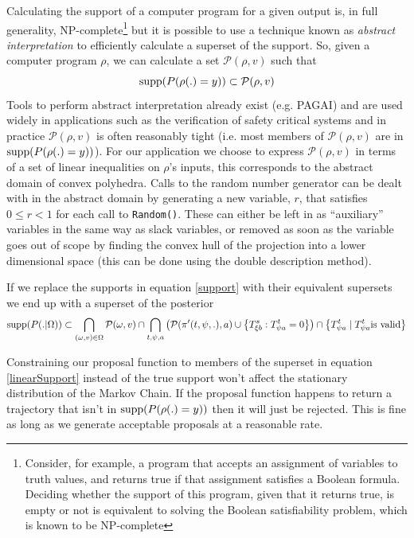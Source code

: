 Calculating the support of a computer program for a given output is, in full generality, NP-complete\footnote{Consider, for example, a program that accepts an assignment of variables to truth values, and returns true if that assignment satisfies a Boolean formula. Deciding whether the support of this program, given that it returns true, is empty or not is equivalent to solving the Boolean satisfiability problem, which is known to be NP-complete\cite{cook1971complexity}} but it is possible to use a technique known as \textit{abstract interpretation}\cite{cousot1977abstract} to efficiently calculate a superset of the support. So, given a computer program $\rho$, we can calculate a set $\mathcal{P}(\rho, v)$ such that
\[
\operatorname{supp}(P(\rho(.)=y)) \subset \mathcal{P}(\rho, v)
\]
Tools to perform abstract interpretation already exist (e.g. PAGAI\cite{henry2012pagai}) and are used widely in applications such as the verification of safety critical systems\cite{blanchet2003static} and in practice $\mathcal{P}(\rho, v)$ is often reasonably tight (i.e. most members of $\mathcal{P}(\rho, v)$ are in $\operatorname{supp}(P(\rho(.)=y))$). For our application we choose to express $\mathcal{P}(\rho, v)$ in terms of a set of linear inequalities on $\rho$'s inputs, this corresponds to the abstract domain of convex polyhedra\cite{cousot1978automatic}\cite{becchi2018efficient}. Calls to the random number generator can be dealt with in the abstract domain by generating a new variable, $r$, that satisfies $0 \le r < 1$ for each call to \texttt{Random()}. These can either be left in as ``auxiliary'' variables in the same way as slack variables, or removed as soon as the variable goes out of scope by finding the convex hull of the projection into a lower dimensional space (this can be done using the double description method\cite{motzkin1953double}).

If we replace the supports in equation \ref{support} with their equivalent supersets we end up with a superset of the posterior
\begin{equation}
\operatorname{supp}(P(.|\Omega)) \subset
\bigcap_{(\omega,v) \in \Omega} \mathcal{P}(\omega, v) \cap
\bigcap_{t, \psi, a} \left( \mathcal{P}(\pi'(t,\psi,.), a) \cup \left\{T^s_{\xi b}: T^t_{\psi a} = 0\right\} \right)\cap
\left\{T^t_{\psi a} \mid T^t_{\psi a} \text{is valid}\right\}
\label{linearSupport}
\end{equation}

Constraining our proposal function to members of the superset in equation \ref{linearSupport} instead of the true support won't affect the stationary distribution of the Markov Chain. If the proposal function happens to return a trajectory that isn't in $\operatorname{supp}(P(\rho(.)=y))$ then it will just be rejected. This is fine as long as we generate acceptable proposals at a reasonable rate.

